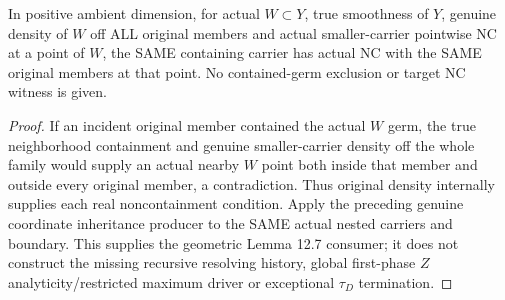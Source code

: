 \begin{theorem}
\label{hir:sharp-original-density-nested-normal-crossings-inheritance}
\leanok
In positive ambient dimension, for actual $W\subset Y$, true smoothness of $Y$, genuine density of $W$ off ALL
original members and actual smaller-carrier pointwise NC at a point of $W$,
the SAME containing carrier has actual NC with the SAME original members at
that point. No contained-germ exclusion or target NC witness is given.
\end{theorem}
\begin{proof}
If an incident original member contained the actual $W$ germ, the true
neighborhood containment and genuine smaller-carrier density off the whole
family would supply an actual nearby $W$ point both inside that member and
outside every original member, a contradiction. Thus original density
internally supplies each real noncontainment condition. Apply the preceding
genuine coordinate inheritance producer to the SAME actual nested carriers
and boundary. This supplies the geometric Lemma 12.7 consumer; it does not
construct the missing recursive resolving history, global first-phase $Z$
analyticity/restricted maximum driver or exceptional $\tau_D$ termination.
\end{proof}
